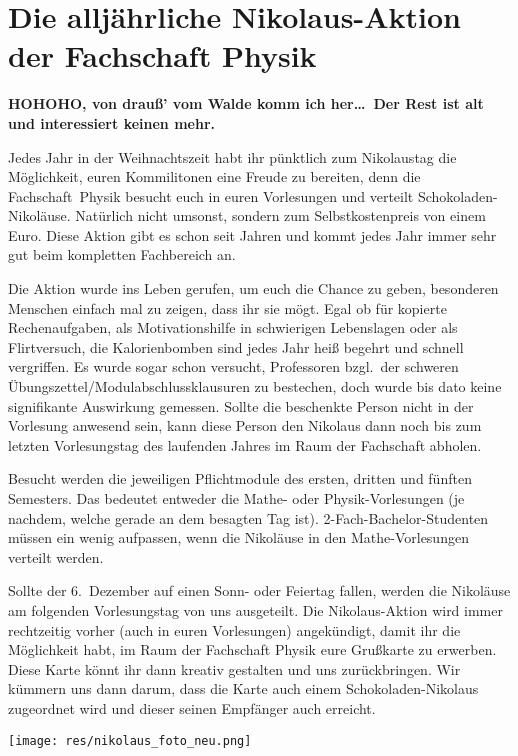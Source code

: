 \section{Die alljährliche Nikolaus-Aktion der Fachschaft Physik}
\begin{multicols}{2}
\textbf{HOHOHO, von drauß' vom Walde komm ich her\dots\
	Der Rest ist alt und interessiert keinen mehr.}

Jedes Jahr in der Weihnachtszeit habt ihr pünktlich zum Nikolaustag die Möglichkeit, euren Kommilitonen eine Freude zu bereiten, denn die Fachschaft~Physik besucht euch in euren Vorlesungen und verteilt Schokoladen-Nikoläuse.
Natürlich nicht umsonst, sondern zum Selbstkostenpreis von einem Euro.
Diese Aktion gibt es schon seit Jahren und kommt jedes Jahr immer sehr gut beim kompletten Fachbereich an.

Die Aktion wurde ins Leben gerufen, um euch die Chance zu geben, besonderen Menschen einfach mal zu zeigen, dass ihr sie mögt.
Egal ob für kopierte Rechenaufgaben, als Motivationshilfe in schwierigen Lebenslagen oder als Flirtversuch, die Kalorienbomben sind jedes Jahr heiß begehrt und schnell vergriffen.
Es wurde sogar schon versucht, Professoren bzgl.\ der schweren Übungszettel/Modulabschlussklausuren zu bestechen, doch wurde bis dato keine signifikante Auswirkung gemessen.
Sollte die beschenkte Person nicht in der Vorlesung anwesend sein, kann diese Person den Nikolaus dann noch bis zum letzten Vorlesungstag des laufenden Jahres im Raum der Fachschaft abholen.

Besucht werden die jeweiligen Pflichtmodule des ersten, dritten und fünften Semesters.
Das bedeutet entweder die Mathe- oder Physik-Vorlesungen (je nachdem, welche gerade an dem besagten Tag ist).
2-Fach-Bachelor-Studenten müssen ein wenig aufpassen, wenn die Nikoläuse in den Mathe-Vorlesungen verteilt werden.

Sollte der 6.~Dezember auf einen Sonn- oder Feiertag fallen, werden die Nikoläuse am folgenden Vorlesungstag von uns ausgeteilt.
Die Nikolaus-Aktion wird immer rechtzeitig vorher (auch in euren Vorlesungen) angekündigt, damit ihr die Möglichkeit habt, im Raum der Fachschaft Physik eure Grußkarte zu erwerben.
Diese Karte könnt ihr dann kreativ gestalten und uns zurückbringen.
Wir kümmern uns dann darum, dass die Karte auch einem Schokoladen-Nikolaus zugeordnet wird und dieser seinen Empfänger auch erreicht.

\end{multicols}

\vspace{\fill}
\begin{center}
	\texttt{[image: res/nikolaus\_foto\_neu.png]}
\end{center}
